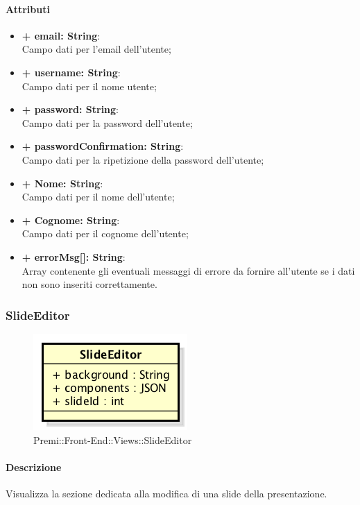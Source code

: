 	\paragraph{Attributi}
	\begin{itemize}
		\item \textbf{+ email: String}:\\
			Campo dati per l'email dell'utente;
		\item \textbf{+ username: String}:\\
			Campo dati per il nome utente;
		\item \textbf{+ password: String}:\\
			Campo dati per la password dell'utente;
		\item \textbf{+ passwordConfirmation: String}:\\
			Campo dati per la ripetizione della password dell'utente;
		\item \textbf{+ Nome: String}:\\
			Campo dati per il nome dell'utente;
		\item \textbf{+ Cognome: String}:\\
			Campo dati per il cognome dell'utente;		
		\item \textbf{+ errorMsg[]: String}:\\
			Array contenente gli eventuali messaggi di errore da fornire all'utente se i dati non sono inseriti correttamente.
	\end{itemize}
\newpage
	
	
\subsubsection{SlideEditor}
	\begin{figure}[h]
		\centering
		\includegraphics[width=0.3\linewidth]{img/premi_front_end_views_slideeditor}
		\caption[Premi::Front-End::Views::SlideEditor]{Premi::Front-End::Views::SlideEditor}
	\end{figure}
	
	\paragraph{Descrizione}
	Visualizza la sezione dedicata alla modifica di una \gls{slide} della presentazione.
	
